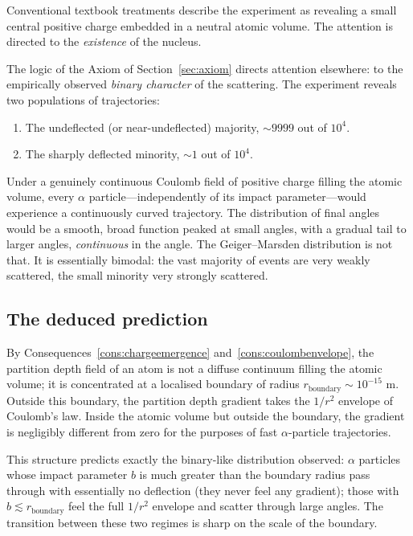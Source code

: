 \documentclass[11pt,twocolumn,a4paper]{article}
\theoremstyle{axiomstyle}
\theoremstyle{conseqstyle}
\theoremstyle{definition}
\theoremstyle{remark}
\begin{document}
Conventional textbook treatments describe the experiment as revealing a small central positive charge embedded in a neutral atomic volume. The attention is directed to the \emph{existence} of the nucleus.

The logic of the Axiom of Section~\ref{sec:axiom} directs attention elsewhere: to the empirically observed \emph{binary character} of the scattering. The experiment reveals two populations of trajectories:
\begin{enumerate}[label=(\alph*)]
\item The undeflected (or near-undeflected) majority, $\sim 9999$ out of $10^{4}$.
\item The sharply deflected minority, $\sim 1$ out of $10^{4}$.
\end{enumerate}
Under a genuinely continuous Coulomb field of positive charge filling the atomic volume, every $\alpha$ particle---independently of its impact parameter---would experience a continuously curved trajectory. The distribution of final angles would be a smooth, broad function peaked at small angles, with a gradual tail to larger angles, \emph{continuous} in the angle. The Geiger--Marsden distribution is not that. It is essentially bimodal: the vast majority of events are very weakly scattered, the small minority very strongly scattered.

\subsection{The deduced prediction}

By Consequences~\ref{cons:chargeemergence} and~\ref{cons:coulombenvelope}, the partition depth field of an atom is not a diffuse continuum filling the atomic volume; it is concentrated at a localised boundary of radius $r_{\text{boundary}}\sim 10^{-15}$ m. Outside this boundary, the partition depth gradient takes the $1/r^{2}$ envelope of Coulomb's law. Inside the atomic volume but outside the boundary, the gradient is negligibly different from zero for the purposes of fast $\alpha$-particle trajectories.

This structure predicts exactly the binary-like distribution observed: $\alpha$ particles whose impact parameter $b$ is much greater than the boundary radius pass through with essentially no deflection (they never feel any gradient); those with $b\lesssim r_{\text{boundary}}$ feel the full $1/r^{2}$ envelope and scatter through large angles. The transition between these two regimes is sharp on the scale of the boundary.
\end{document}
